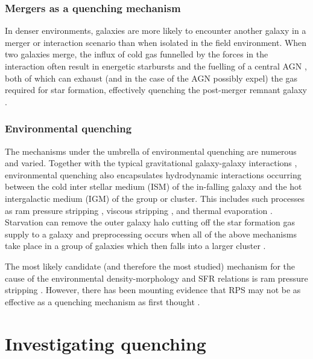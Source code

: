 \subsubsection{Mergers as a quenching mechanism}\label{sec:mergersquench}
In denser environments, galaxies are more likely to encounter another galaxy in a merger or interaction scenario than when isolated in the field environment. When two galaxies merge, the influx of cold gas funnelled by the forces in the interaction often result in energetic starbursts and the fuelling of a central AGN \citep{hopkins05}, both of which can exhaust  (and in the case of the AGN possibly expel) the gas required for star formation, effectively quenching the post-merger remnant galaxy \citep{pontzen16}. 

\subsubsection{Environmental quenching}\label{sec:envquench}
The mechanisms under the umbrella of environmental quenching are  numerous and varied. Together with the typical gravitational galaxy-galaxy interactions \citep{moore96}, environmental quenching also encapsulates hydrodynamic interactions occurring between the cold inter stellar medium (ISM) of the in-falling galaxy and the hot intergalactic medium (IGM) of the group or cluster. This includes such processes as ram pressure stripping \citep{gunngott72}, viscous stripping \citep{nulsen82}, and thermal evaporation \citep[a rapid rise in temperature of the ISM due to contact with the IGM;][]{cowie77}. Starvation \citep{larson80} can remove the outer galaxy halo cutting off the star formation gas supply to a galaxy and preprocessing occurs when all of the above mechanisms take place in a group of galaxies which then falls into a larger cluster \citep{dressler04}. 

The most likely candidate (and therefore the most studied) mechanism for the cause of the environmental density-morphology and SFR relations is ram pressure stripping \citep[RPS;][]{abadi99, poggianti99}. However, there has been mounting evidence that RPS may not be as effective as a  quenching mechanism as first thought \citep{emerick16, fillingham16}. 

\section{Investigating quenching}\label{sec:invquench}



